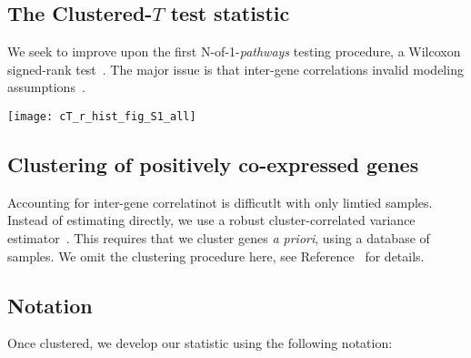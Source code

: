 \documentclass[a0,portrait]{a0poster}
\begin{document}
\begin{multicols}{3}
\section{The Clustered-$T$ test statistic}
We seek to improve upon the first N-of-1-\textit{pathways} testing procedure, a Wilcoxon signed-rank test~\cite{Gardeux2014}. The major issue is that inter-gene correlations invalid modeling assumptions~\cite{Tamayo2016}.

\begin{center}\vspace{1cm}
\texttt{[image: cT\_r\_hist\_fig\_S1\_all]}
\end{center}\vspace{1cm}

\subsection{Clustering of positively co-expressed genes}
Accounting for inter-gene correlatinot is difficutlt with only limtied samples. Instead of estimating directly, we use a robust cluster-correlated variance estimator~\cite{Williams2000}. This requires that we cluster genes \textit{a priori}, using a database of samples. We omit the clustering procedure here, see Reference~\cite{Schissler2018} for details.

\subsection{Notation}
Once clustered, we develop our statistic using the following notation:\\


\end{multicols}
\end{document}
